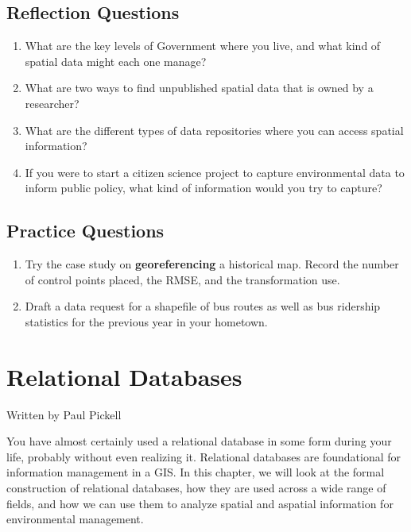 \documentclass[
]{book}
\providecommand{\tightlist}{%
  \setlength{\itemsep}{0pt}\setlength{\parskip}{0pt}}
\begin{document}
\hypertarget{reflection-questions-3}{%
\section{Reflection Questions}\label{reflection-questions-3}}

\begin{enumerate}
\def\labelenumi{\arabic{enumi}.}
\tightlist
\item
  What are the key levels of Government where you live, and what kind of spatial data might each one manage?
\item
  What are two ways to find unpublished spatial data that is owned by a researcher?
\item
  What are the different types of data repositories where you can access spatial information?
\item
  If you were to start a citizen science project to capture environmental data to inform public policy, what kind of information would you try to capture?
\end{enumerate}

\hypertarget{practice-questions-2}{%
\section{Practice Questions}\label{practice-questions-2}}

\begin{enumerate}
\def\labelenumi{\arabic{enumi}.}
\tightlist
\item
  Try the case study on \textbf{georeferencing} a historical map. Record the number of control points placed, the RMSE, and the transformation use.
\item
  Draft a data request for a shapefile of bus routes as well as bus ridership statistics for the previous year in your hometown.
\end{enumerate}

\hypertarget{relational-databases}{%
\chapter{Relational Databases}\label{relational-databases}}

Written by
Paul Pickell

You have almost certainly used a relational database in some form during your life, probably without even realizing it. Relational databases are foundational for information management in a GIS. In this chapter, we will look at the formal construction of relational databases, how they are used across a wide range of fields, and how we can use them to analyze spatial and aspatial information for environmental management.
\end{document}
